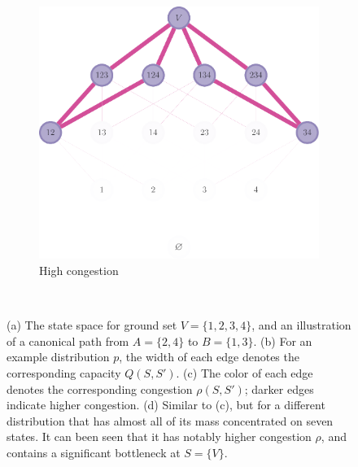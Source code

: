 \begin{figure}[tbp]
\begin{subfigure}[b]{\subflen}
    \label{fig:cong3}
  \end{subfigure}\hspace{1em}
  \begin{subfigure}[b]{\subflen}
    \centering
    \includegraphics[width=\textwidth]{figures/gibbs/cp_hard_cong.pdf}
    \caption{High congestion}
    \label{fig:cong4}
  \end{subfigure}\\
  \caption{(a) The state space for ground set $V = \{1, 2, 3, 4\}$, and an illustration of a canonical path from $A = \{2, 4\}$ to $B = \{1, 3\}$.
  (b) For an example distribution $p$, the width of each edge denotes the corresponding capacity $Q(S, S')$.
  (c) The color of each edge denotes the corresponding congestion $\rho(S, S')$; darker edges indicate higher congestion.
  (d) Similar to (c), but for a different distribution that has almost all of its mass concentrated on seven states.
  It can been seen that it has notably higher congestion $\rho$, and contains a significant bottleneck at $S = \{V\}$.
  }
  \label{fig:cong}
\end{figure}


